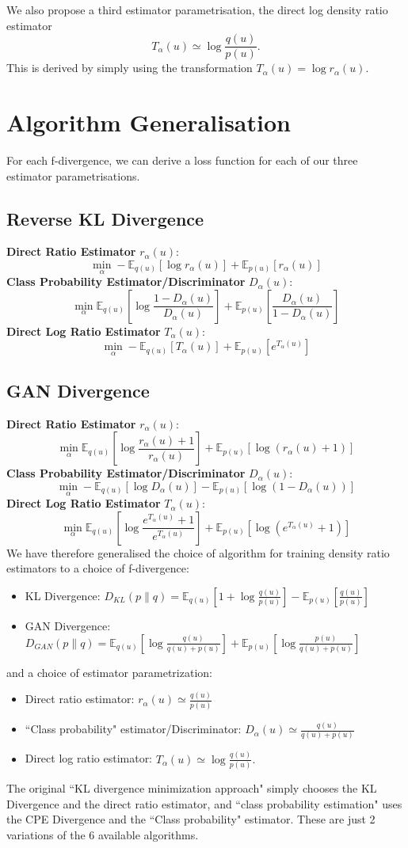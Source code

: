 \documentclass[honours,12pt]{unswthesis}
\newcommand{\E}{\mathbb{E}}
\numberwithin{equation}{section}
\theoremstyle{definition}
\begin{document}
We also propose a third estimator parametrisation, the direct log density ratio estimator
\[T_\alpha(u)\simeq \log \frac{q(u)}{p(u)}.\]
This is derived by simply using the transformation $T_\alpha(u)=\log r_\alpha(u)$.
\section{Algorithm Generalisation}
For each f-divergence, we can derive a loss function for each of our three estimator parametrisations.
\subsection{Reverse KL Divergence}
\textbf{Direct Ratio Estimator} $r_\alpha(u)$:
\[\min_\alpha -\mathbb{E}_{q(u)}[\log r_\alpha(u)]+\mathbb{E}_{p(u)}[r_\alpha(u)]\]
\textbf{Class Probability Estimator/Discriminator} $D_\alpha(u)$:
\[\min_\alpha \mathbb{E}_{q(u)}\left[\log \frac{1-D_\alpha(u)}{D_\alpha(u)}\right]+\mathbb{E}_{p(u)}\left[\frac{D_\alpha(u)}{1-D_\alpha(u)}\right]\]
\textbf{Direct Log Ratio Estimator} $T_\alpha(u)$:
\[\min_\alpha -\mathbb{E}_{q(u)}[T_\alpha(u)]+\mathbb{E}_{p(u)}[e^{T_\alpha (u)}]\]
\subsection{GAN Divergence}
\textbf{Direct Ratio Estimator} $r_\alpha(u)$:
\[\min_\alpha \E_{q(u)}\left[\log \frac{r_\alpha(u)+1}{r_\alpha(u)}\right]+\E_{p(u)}[\log (r_\alpha(u)+1)]\]
\textbf{Class Probability Estimator/Discriminator} $D_\alpha(u)$:
\[\min_\alpha -\E_{q(u)}[\log D_\alpha(u)]-\E_{p(u)}[\log (1-D_\alpha(u))]\]
\textbf{Direct Log Ratio Estimator} $T_\alpha(u)$:
\[\min_\alpha \E_{q(u)}\left[\log \frac{e^{T_\alpha(u)}+1}{e^{T_\alpha(u)}}\right]+\E_{p(u)}[\log(e^{T_\alpha(u)}+1)]\]
We have therefore generalised the choice of algorithm for training density ratio estimators to a choice of f-divergence:
\begin{itemize}
\item KL Divergence: $D_{KL}(p\|q)=\mathbb{E}_{q(u)}[1+\log \frac{q(u)}{p(u)}]-\mathbb{E}_{p(u)}\left[\frac{q(u)}{p(u)}\right]$
\item GAN Divergence: $D_{GAN}(p\|q)=\mathbb{E}_{q(u)}\left[\log \frac{q(u)}{q(u)+p(u)}\right]+\mathbb{E}_{p(u)}\left[\log \frac{p(u)}{q(u)+p(u)}\right]$
\end{itemize}
and a choice of estimator parametrization:
\begin{itemize}
\item Direct ratio estimator: $r_\alpha(u)\simeq\frac{q(u)}{p(u)}$
\item ``Class probability" estimator/Discriminator: $D_\alpha(u)\simeq\frac{q(u)}{q(u)+p(u)}$
\item Direct log ratio estimator: $T_\alpha(u)\simeq\log \frac{q(u)}{p(u)}.$
\end{itemize}
The original ``KL divergence minimization approach" simply chooses the KL Divergence and the direct ratio estimator, and ``class probability estimation" uses the CPE Divergence and the ``Class probability" estimator. These are just 2 variations of the 6 available algorithms.
\end{document}

